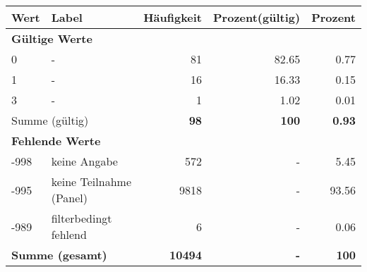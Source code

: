     \begin{longtable}{lXrrr}
     \toprule
     \textbf{Wert} & \textbf{Label} & \textbf{Häufigkeit} & \textbf{Prozent(gültig)} & \textbf{Prozent} \\
     \endhead
     \midrule
     \multicolumn{5}{l}{\textbf{Gültige Werte}}\\

     0 &
     \multicolumn{1}{X}{ -  } &


       \num{81} &
       \num[round-mode=places,round-precision=2]{82.65} &
         \num[round-mode=places,round-precision=2]{0.77} \\

     1 &
     \multicolumn{1}{X}{ -  } &


       \num{16} &
       \num[round-mode=places,round-precision=2]{16.33} &
         \num[round-mode=places,round-precision=2]{0.15} \\

     3 &
     \multicolumn{1}{X}{ -  } &


       \num{1} &
       \num[round-mode=places,round-precision=2]{1.02} &
         \num[round-mode=places,round-precision=2]{0.01} \\
     \midrule
     \multicolumn{2}{l}{Summe (gültig)} &
       \textbf{\num{98}} &
     \textbf{\num{100}} &
       \textbf{\num[round-mode=places,round-precision=2]{0.93}} \\
     \multicolumn{5}{l}{\textbf{Fehlende Werte}}\\
       -998 &
       keine Angabe &
         \num{572} &
        - &
         \num[round-mode=places,round-precision=2]{5.45} \\
       -995 &
       keine Teilnahme (Panel) &
         \num{9818} &
        - &
         \num[round-mode=places,round-precision=2]{93.56} \\
       -989 &
       filterbedingt fehlend &
         \num{6} &
        - &
         \num[round-mode=places,round-precision=2]{0.06} \\
     \midrule
     \multicolumn{2}{l}{\textbf{Summe (gesamt)}} &
          \textbf{\num{10494}} &
        \textbf{-} &
        \textbf{\num{100}} \\
     \bottomrule
     \end{longtable}
     
